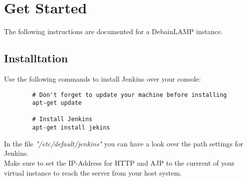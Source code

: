 \documentclass[a4paper]{article}
\begin{document}
	\newpage
	\section{Get Started}
	The following instructions are documented for a DebainLAMP instance.
	\subsection{Installtation}
	Use the following commands to install Jenkins over your console:
	\begin{tiny}
	\begin{lstlisting}
		# Don't forget to update your machine before installing
		apt-get update
		
		# Install Jenkins
		apt-get install jekins
	\end{lstlisting}
	\end{tiny}
	In the file \textit{"/etc/default/jenkins"} you can have a look over the path settings for Jenkins.\\
	Make sure to set the IP-Address for HTTP and AJP to the currrent of your virtual instance to reach the server from your host system.
\end{document}
